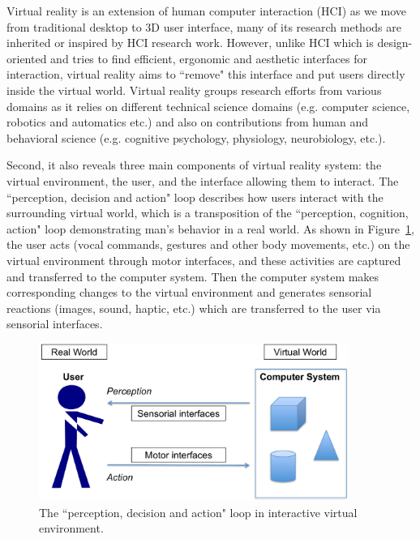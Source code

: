 Virtual reality is an extension of human computer interaction (HCI) as we move from traditional desktop to 3D user interface, many of its research methods are inherited or inspired by HCI research work. However, unlike HCI which is design-oriented and tries to find efficient, ergonomic and aesthetic interfaces for interaction, virtual reality aims to ``remove" this interface and put users directly inside the virtual world. Virtual reality groups research efforts from various domains as it relies on different technical science domains (e.g. computer science, robotics and automatics etc.) and also on contributions from human and behavioral science (e.g. cognitive psychology, physiology, neurobiology, etc.).

Second, it also reveals three main components of virtual reality system: the virtual environment, the user, and the interface allowing them to interact. The ``perception, decision and action" loop \citep{Fuchs2011Book} describes how users interact with the surrounding virtual world, which is a transposition of the ``perception, cognition, action" loop demonstrating man's behavior in a real world. As shown in Figure~\ref{fig:1_loop}, the user acts (vocal commands, gestures and other body movements, etc.) on the virtual environment through motor interfaces, and these activities are captured and transferred to the computer system. Then the computer system makes corresponding changes to the virtual environment and generates sensorial reactions (images, sound, haptic, etc.) which are transferred to the user via sensorial interfaces.

\begin{figure}[tb]
  \centering
  \includegraphics[width=0.9\textwidth]{figures/ch1/loop}
  \caption{\label{fig:1_loop}The ``perception, decision and action" loop in interactive virtual environment.}
\end{figure}

